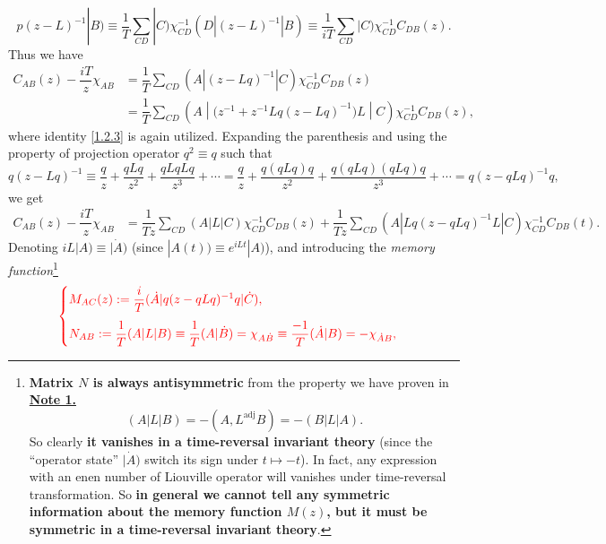 \documentclass[10pt,nofootinbib,letterpaper]{revtex4}
\newcounter{Note}[section]
\begin{document}
		\begin{equation*}
			p(z-L)^{-1}|B)\equiv\dfrac{1}{T}\sum_{CD}|C)\chi_{CD}^{-1}(D|(z-L)^{-1}|B)\equiv\dfrac{1}{iT}\sum_{CD}|C)\chi_{CD}^{-1} C_{DB}(z).
		\end{equation*}
		Thus we have
		\begin{align*}
			C_{AB}(z)-\dfrac{iT}{z}\chi_{AB}&=\dfrac{1}{T}\sum_{CD} (A|(z-Lq)^{-1}|C)\chi_{CD}^{-1}C_{DB}(z)\\
			&=\dfrac{1}{T}\sum_{CD} \left(A\middle|\bigg(z^{-1}+z^{-1}Lq(z-Lq)^{-1}\bigg)L\middle|C\right)\chi_{CD}^{-1}C_{DB}(z), 
		\end{align*}
		where identity \eqref{1.2.3} is again utilized. Expanding the parenthesis and using the property of projection operator $q^2\equiv q$ such that
		\begin{equation*}
			q(z-Lq)^{-1}\equiv\dfrac{q}{z}+\dfrac{qLq}{z^2}+\dfrac{qLqLq}{z^3}+\cdots=\dfrac{q}{z}+\dfrac{q(qLq)q}{z^2}+\dfrac{q(qLq)(qLq)q}{z^3}+\cdots=q(z-qLq)^{-1}q,
		\end{equation*}
		we get
		\begin{align*}
			C_{AB}(z)-\dfrac{iT}{z}\chi_{AB}&=\dfrac{1}{Tz}\sum_{CD}(A|L|C)\chi_{CD}^{-1}C_{DB}(z)+\dfrac{1}{Tz}\sum_{CD}(A|Lq(z-qLq)^{-1}L|C)\chi_{CD}^{-1}C_{DB}(t).
		\end{align*}
		Denoting $iL|A)\equiv|\dot{A})$ (since $|A(t))\equiv e^{iLt}|A)$), and introducing the \emph{memory function}\footnote{\textbf{Matrix $N$ is always antisymmetric} from the property we have proven in \underline{\bfseries{Note 1.}} 
		\begin{equation*}
			(A|L|B)=-(A,L^{\mathrm{adj}}B)=-(B|L|A).
		\end{equation*}
		So clearly \textbf{it vanishes in a time-reversal invariant theory} (since the ``operator state'' $|\dot{A})$ switch its sign under $t\mapsto-t$). In fact, any expression with an enen number of Liouville operator will vanishes under time-reversal transformation. So \textbf{in general  we cannot tell any symmetric information about the memory function $M(z)$, but it must be symmetric in a time-reversal invariant theory}.}
		\begin{equation}\label{1.2.4}
			{\color{red}
			\begin{cases}
				M_{AC}(z):=\dfrac{i}{T}(\dot{A}|q(z-qLq)^{-1}q|\dot{C}),\\[1em]
				N_{AB}:=\dfrac{1}{T}(A|L|B)\equiv\dfrac{1}{T}(A|\dot{B})=\chi_{A\dot{B}}\equiv\dfrac{-1}{T}(\dot{A}|B)=-\chi_{\dot{A}B},
			\end{cases}}
		\end{equation}
\end{document}
